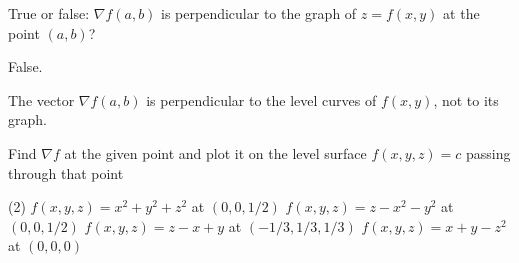 \begin{question}
True or false: $\nabla f(a,b)$ is perpendicular to the graph of $z=f(x,y)$ at the point $(a,b)$?
\end{question}

\begin{solution}
False.

The vector $\nabla f(a,b)$ is perpendicular to the level curves of $f(x,y)$, not to its graph.
\end{solution}

\begin{question}
Find $\nabla f$ at the given point and plot it on the level surface $f(x,y,z)=c$ passing through that point
\begin{tasks}(2)
\task
$f(x,y,z) = x^2 + y^2 + z^2$ at $(0,0,1/2)$
\task
$f(x,y,z) = z - x^2 - y^2$ at $(0,0,1/2)$
\task
$f(x,y,z) = z - x + y$ at $(-1/3,1/3,1/3)$
\task
$f(x,y,z) = x + y - z^2$ at $\left(0,0,0\right)$
\end{tasks}
\end{question}

